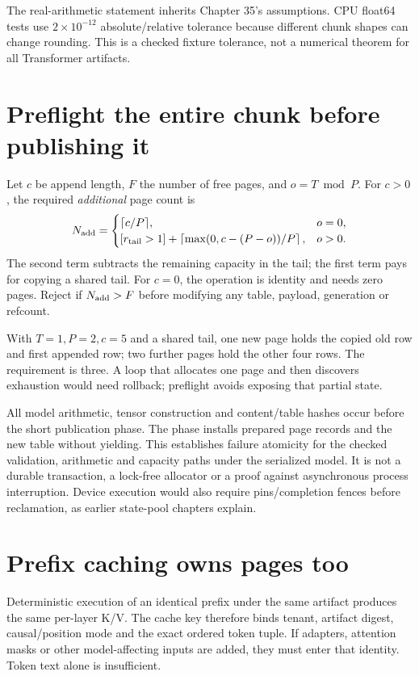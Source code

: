 The real-arithmetic statement inherits Chapter 35's assumptions. CPU
float64 tests use $2\times10^{-12}$ absolute/relative tolerance because
different chunk shapes can change rounding. This is a checked fixture
tolerance, not a numerical theorem for all Transformer artifacts.

\section{Preflight the entire chunk before publishing it}
\label{evod36:atomic}
Let $c$ be append length, $F$ the number of free pages, and $o=T\bmod P$.
For $c>0$, the required \emph{additional} page count is
\[
 N_{\rm add}=\begin{cases}
 \lceil c/P\rceil,&o=0,\\
 [r_{\rm tail}>1]+\left\lceil\max(0,c-(P-o))/P\right\rceil,&o>0.
 \end{cases}
\]
The second term subtracts the remaining capacity in the tail; the first
term pays for copying a shared tail. For $c=0$, the operation is identity
and needs zero pages. Reject if $N_{\rm add}>F$ before modifying any table,
payload, generation or refcount.


With $T=1,P=2,c=5$ and a shared tail, one new page holds the copied old row
and first appended row; two further pages hold the other four rows.
The requirement is three. A loop that allocates one page and then discovers
exhaustion would need rollback; preflight avoids exposing that partial state.



All model arithmetic, tensor construction and content/table hashes occur
before the short publication phase. The phase installs prepared page
records and the new table without yielding. This establishes failure
atomicity for the checked validation, arithmetic and capacity paths under
the serialized model. It is not a durable transaction, a lock-free allocator
or a proof against asynchronous process interruption. Device execution
would also require pins/completion fences before reclamation, as earlier
state-pool chapters explain.

\section{Prefix caching owns pages too}
\label{evod36:prefix}
Deterministic execution of an identical prefix under the same artifact
produces the same per-layer K/V. The cache key therefore binds tenant,
artifact digest, causal/position mode and the exact ordered token tuple.
If adapters, attention masks or other model-affecting inputs are added,
they must enter that identity. Token text alone is insufficient.

